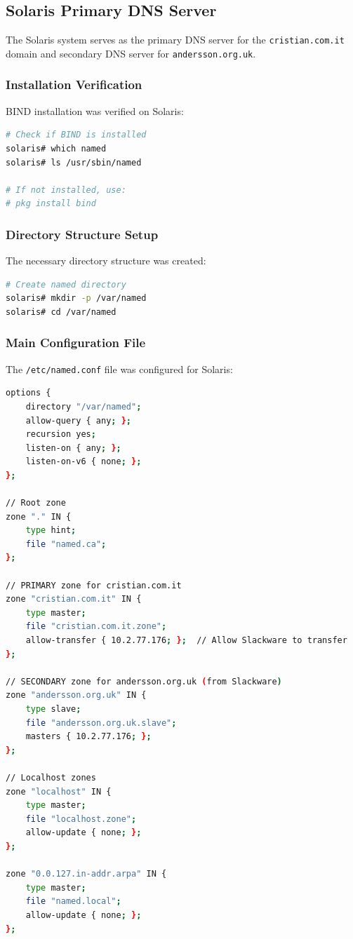\documentclass[12pt,a4paper]{article}
\begin{document}
\subsection{Solaris Primary DNS Server}\label{subsec:solaris-dns}

The Solaris system serves as the primary DNS server for the \texttt{cristian.com.it} domain and secondary DNS server for \texttt{andersson.org.uk}.

\subsubsection{Installation Verification}
BIND installation was verified on Solaris:

\begin{lstlisting}[language=bash, caption=Verifying BIND on Solaris]
# Check if BIND is installed
solaris# which named
solaris# ls /usr/sbin/named

# If not installed, use:
# pkg install bind
\end{lstlisting}

\subsubsection{Directory Structure Setup}
The necessary directory structure was created:

\begin{lstlisting}[language=bash, caption=Creating Directory Structure]
# Create named directory
solaris# mkdir -p /var/named
solaris# cd /var/named
\end{lstlisting}

\subsubsection{Main Configuration File}
The \texttt{/etc/named.conf} file was configured for Solaris:

\begin{lstlisting}[language=bash, caption=Solaris named.conf Configuration]
options {
    directory "/var/named";
    allow-query { any; };
    recursion yes;
    listen-on { any; };
    listen-on-v6 { none; };
};

// Root zone
zone "." IN {
    type hint;
    file "named.ca";
};

// PRIMARY zone for cristian.com.it
zone "cristian.com.it" IN {
    type master;
    file "cristian.com.it.zone";
    allow-transfer { 10.2.77.176; };  // Allow Slackware to transfer
};

// SECONDARY zone for andersson.org.uk (from Slackware)
zone "andersson.org.uk" IN {
    type slave;
    file "andersson.org.uk.slave";
    masters { 10.2.77.176; };
};

// Localhost zones
zone "localhost" IN {
    type master;
    file "localhost.zone";
    allow-update { none; };
};

zone "0.0.127.in-addr.arpa" IN {
    type master;
    file "named.local";
    allow-update { none; };
};
\end{lstlisting}
\end{document}
